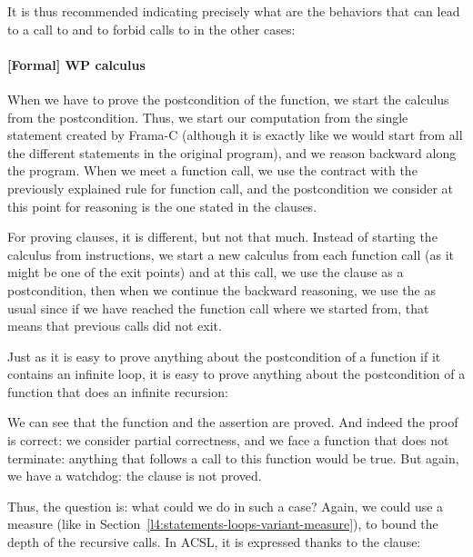 

It is thus recommended indicating precisely what are the behaviors that can lead
to a call to  and to forbid calls to  in the
other cases:




\paragraph*{[Formal] WP calculus}


When we have to prove the postcondition of the function, we start the calculus
from the postcondition. Thus, we start our computation from the single
 statement created by Frama-C (although it is exactly like
we would start from all the different  statements in the
original program), and we reason backward along the program. When we meet a
function call, we use the contract with the previously explained rule for
function call, and the postcondition we consider at this point for reasoning is
the one stated in the  clauses.


For proving  clauses, it is different, but not that much.
Instead of starting the calculus from  instructions, we start
a new calculus from each function call (as it might be one of the exit points)
and at this call, we use the  clause as a postcondition, then
when we continue the backward reasoning, we use the  as
usual since if we have reached the function call where we started from, that
means that previous calls did not exit.




Just as it is easy to prove anything about the postcondition of a function if it
contains an infinite loop, it is easy to prove anything about the postcondition
of a function that does an infinite recursion:






We can see that the function and the assertion are proved. And indeed the
proof is correct: we consider partial correctness, and we face a function
that does not terminate: anything that follows a call to this function would
be true. But again, we have a watchdog: the  clause is
not proved.


Thus, the question is: what could we do in such a case? Again, we could use
a measure (like in Section~\ref{l4:statements-loops-variant-measure}), to
bound the depth of the recursive calls. In ACSL, it is expressed thanks to the
 clause:


